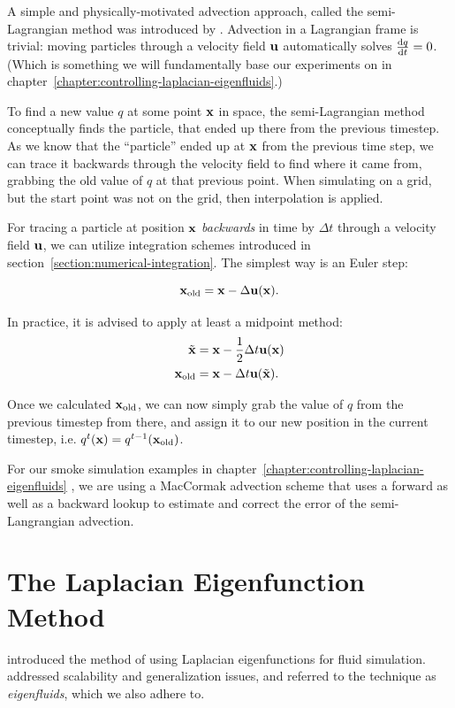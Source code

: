 A simple and physically-motivated advection approach, called the semi-Lagrangian
method was introduced by \citet{StableFluids}.  Advection in a Lagrangian frame
is trivial: moving particles through a velocity field $\vb{u}$ automatically
solves $\dv{q}{t} = 0$. (Which is something we will fundamentally base our
experiments on in chapter~\ref{chapter:controlling-laplacian-eigenfluids}.) 

To find a new value $q$ at some point $\vb{x}$ in space, the semi-Lagrangian
method conceptually finds the particle, that ended up there from the previous
timestep. As we know that the ``particle'' ended up at $\vb{x}$ from the previous
time step, we can trace it backwards through the velocity field to find where it
came from, grabbing the old value of $q$ at that previous point. When simulating
on a grid, but the start point was not on the grid, then interpolation is
applied.

For tracing a particle at position $\vb{x}$ \textit{backwards} in time by
$\Delta t$ through a velocity field $\vb{u}$, we can utilize integration schemes
introduced in section~\ref{section:numerical-integration}.  The simplest way is
an Euler step: 

$$\vb{x}_{\text{old}} = \vb{x} - \Delta \vb{u}(\vb{x}).$$

In practice, it is advised to apply at least a midpoint method: 
\begin{align*}
    \tilde{\vb{x}} &= \vb{x} - \frac{1}{2}\Delta t \vb{u}(\vb{x})\\
    \vb{x}_{\text{old}} &= \vb{x} - \Delta t \vb{u}(\tilde{\vb{x}}).
\end{align*}

Once we calculated $\vb{x}_{\text{old}}$, we can now simply grab the value of
$q$ from the previous timestep from there, and assign it to our new position in
the current timestep, i.e. $q^{t}(\vb{x}) = q^{t-1}(\vb{x}_{\text{old}})$.

For our smoke simulation examples in
chapter~\ref{chapter:controlling-laplacian-eigenfluids} , we are using
a MacCormak advection scheme \cite{maccormack} that uses a forward as well as
a backward lookup to estimate and correct the error of the semi-Langrangian
advection.

\section{The Laplacian Eigenfunction Method}
\label{section:laplacian-eigenfluids}
\citet{dewitt} introduced the method of using Laplacian eigenfunctions for fluid
simulation. \citet{scalable-eigenfluids} addressed scalability and generalization
issues, and referred to the technique as \textit{eigenfluids}, which we also
adhere to.


